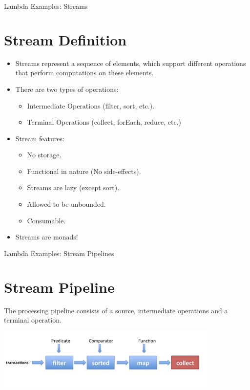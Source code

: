 \documentclass{beamer}
\begin{document}
	\begin{frame}[fragile]{Lambda Examples: Streams}
		\section{Stream Definition}
		
			\begin{itemize}
				\item Streams represent a sequence of elements, which support different operations that perform computations on these elements. 
				\item There are two types of operations:
				\begin{itemize}
					\item Intermediate Operations (filter, sort, etc.). 
					\item Terminal Operations (collect, forEach, reduce, etc.)
				\end{itemize}

				\item Stream features:
				\begin{itemize}
				\item No storage. 
				\item Functional in nature (No side-effects).
				\item Streams are lazy (except sort).
				\item Allowed to be unbounded.
				\item Consumable.
				\end{itemize}
				\item Streams are monads!
			\end{itemize}

	\end{frame}	

	\begin{frame}[fragile]{Lambda Examples: Stream Pipelines}
		\section{Stream Pipeline}
		
		The processing pipeline consists of a source, intermediate operations and a terminal operation.
		
		\includegraphics[width=11cm]{pipeline}	
		
	\end{frame}	
\end{document}
